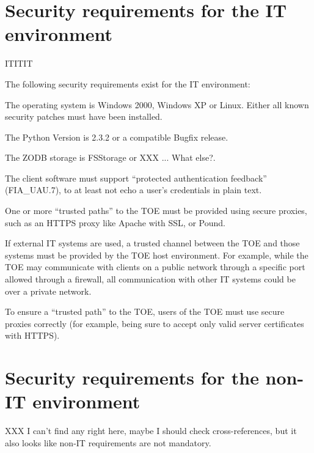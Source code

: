 \documentclass[10pt,a4paper,english]{scrbook}
\begin{document}
\section{Security requirements for the IT environment}

ITITIT

The following security requirements exist for the IT environment:

The operating system is Windows 2000, Windows XP or Linux. Either all
known security patches must have been installed.

The Python Version is 2.3.2 or a compatible Bugfix release.

The ZODB storage is FSStorage or XXX ... What else?.

The client software must support ``protected authentication feedback''
(FIA{\_}UAU.7), to at least not echo a user's credentials in plain text.

One or more ``trusted paths'' to the TOE must be provided using secure
proxies, such as an HTTPS proxy like Apache with SSL, or Pound.

If external IT systems are used, a trusted channel between the TOE and
those systems must be provided by the TOE host environment.  For
example, while the TOE may communicate with clients on a public
network through a specific port allowed through a firewall, all
communication with other IT systems could be over a private network.

To ensure a ``trusted path'' to the TOE, users of the TOE must use
secure proxies correctly (for example, being sure to accept only
valid server certificates with HTTPS).



\hypertarget{security-requirements-for-the-non-it-environment}{}
\section{Security requirements for the non-IT environment}

XXX I can't find any right here, maybe I should check cross-references, but it
also looks like non-IT requirements are not mandatory.



\hypertarget{toe-summary-specification}{}
\end{document}
